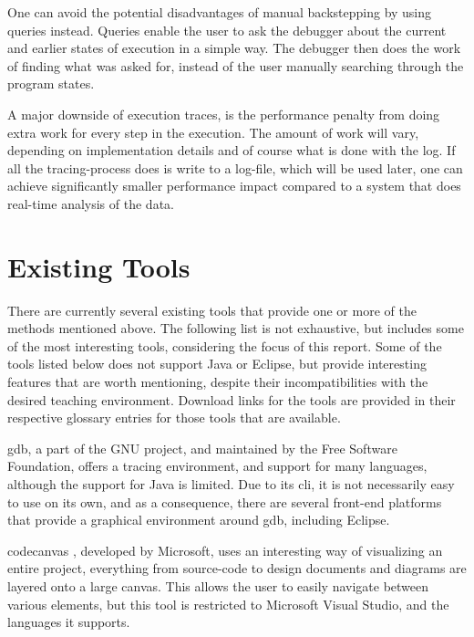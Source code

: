 One can avoid the potential disadvantages of manual backstepping by using queries instead.
Queries enable the user to ask the debugger about the current and earlier states of execution in a simple way.
The debugger then does the work of finding what was asked for, instead of the user manually searching through the program states.

A major downside of execution traces, is the performance penalty from doing extra work for every step in the execution.
The amount of work will vary, depending on implementation details and of course what is done with the log.
If all the tracing-process does is write to a log-file, which will be used later, one can achieve significantly smaller performance impact compared to a system that does real-time analysis of the data.

\section{Existing Tools}\label{PreTools}%

There are currently several existing tools that provide one or more of the methods mentioned above.
The following list is not exhaustive, but includes some of the most interesting tools, considering the focus of this report.
Some of the tools listed below does not support Java or Eclipse, but provide interesting features that are worth mentioning, despite their incompatibilities with the desired teaching environment.
Download links for the tools are provided in their respective glossary entries for those tools that are available.

\gls{gdb}, a part of the GNU project, and maintained by the Free Software Foundation, offers a tracing environment, and support for many languages, although the support for Java is limited.
Due to its \gls{cli}, it is not necessarily easy to use on its own, and as a consequence, there are several front-end platforms that provide a graphical environment around \gls{gdb}, including Eclipse.

\Gls{codecanvas} \cite{Deline2010}, developed by Microsoft, uses an interesting way of visualizing an entire project, everything from source-code to design documents and diagrams are layered onto a large canvas.
This allows the user to easily navigate between various elements, but this tool is restricted to Microsoft Visual Studio, and the languages it supports.

